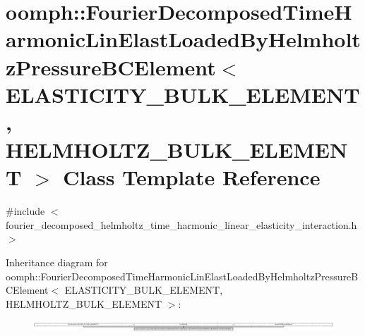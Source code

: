 \hypertarget{classoomph_1_1FourierDecomposedTimeHarmonicLinElastLoadedByHelmholtzPressureBCElement}{}\section{oomph\+:\+:Fourier\+Decomposed\+Time\+Harmonic\+Lin\+Elast\+Loaded\+By\+Helmholtz\+Pressure\+B\+C\+Element$<$ E\+L\+A\+S\+T\+I\+C\+I\+T\+Y\+\_\+\+B\+U\+L\+K\+\_\+\+E\+L\+E\+M\+E\+NT, H\+E\+L\+M\+H\+O\+L\+T\+Z\+\_\+\+B\+U\+L\+K\+\_\+\+E\+L\+E\+M\+E\+NT $>$ Class Template Reference}
\label{classoomph_1_1FourierDecomposedTimeHarmonicLinElastLoadedByHelmholtzPressureBCElement}


{\ttfamily \#include $<$fourier\+\_\+decomposed\+\_\+helmholtz\+\_\+time\+\_\+harmonic\+\_\+linear\+\_\+elasticity\+\_\+interaction.\+h$>$}

Inheritance diagram for oomph\+:\+:Fourier\+Decomposed\+Time\+Harmonic\+Lin\+Elast\+Loaded\+By\+Helmholtz\+Pressure\+B\+C\+Element$<$ E\+L\+A\+S\+T\+I\+C\+I\+T\+Y\+\_\+\+B\+U\+L\+K\+\_\+\+E\+L\+E\+M\+E\+NT, H\+E\+L\+M\+H\+O\+L\+T\+Z\+\_\+\+B\+U\+L\+K\+\_\+\+E\+L\+E\+M\+E\+NT $>$\+:\begin{figure}[H]
\begin{center}
\leavevmode
\includegraphics[height=0.409806cm]{classoomph_1_1FourierDecomposedTimeHarmonicLinElastLoadedByHelmholtzPressureBCElement}
\end{center}
\end{figure}
